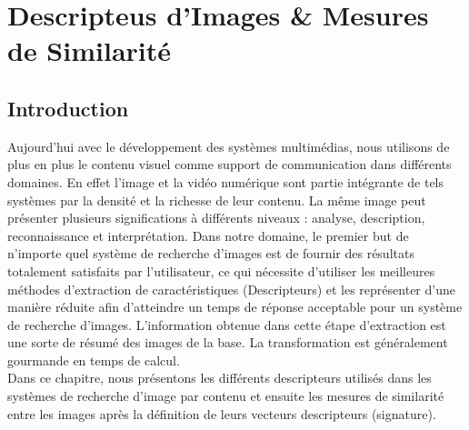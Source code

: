 
\chapter{Descripteus d'Images \&  Mesures de Similarité} %

\label{ChapterX} %


\section{Introduction}
Aujourd’hui avec le développement des systèmes multimédias, nous utilisons de plus en plus le contenu visuel comme support de communication dans différents domaines. En effet l’image et la vidéo numérique sont partie intégrante de tels systèmes par la densité et la richesse de leur contenu. La même image peut présenter plusieurs significations à différents niveaux : analyse, description, reconnaissance et interprétation. Dans notre domaine, le premier but de n’importe quel système de recherche d’images est
de fournir des résultats totalement satisfaits par l’utilisateur, ce qui nécessite d’utiliser les meilleures méthodes d’extraction de caractéristiques (Descripteurs) et les représenter d’une manière réduite afin d’atteindre un temps de réponse acceptable pour un système de recherche d’images. L’information obtenue dans cette étape d'extraction est une sorte de résumé des images de la base. La transformation est généralement gourmande en temps de calcul.\\

Dans ce chapitre, nous présentons les différents descripteurs utilisés dans les systèmes de recherche d’image par contenu et ensuite les mesures de similarité entre les images après la définition de leurs vecteurs descripteurs (signature).





